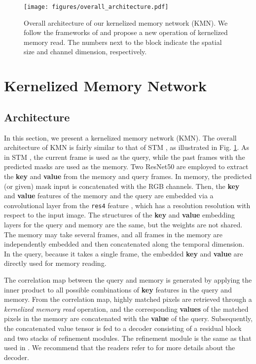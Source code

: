\documentclass[runningheads]{llncs}
\begin{document}
\begin{figure}[t]
\centering
\texttt{[image: figures/overall\_architecture.pdf]}
\caption{
Overall architecture of our kernelized memory network (KMN). We follow the frameworks of \cite{Oh_2019_ICCV} and propose a new operation of kernelized memory read. The numbers next to the block indicate the spatial size and channel dimension, respectively.
}
\label{fig:overall_architecture}
\end{figure}

\section{Kernelized Memory Network}
\label{s3}

\subsection{Architecture}
\label{s31}
In this section, we present a kernelized memory network (KMN). The overall architecture of KMN is fairly similar to that of STM \cite{Oh_2019_ICCV}, as illustrated in Fig. \ref{fig:overall_architecture}. As in STM \cite{Oh_2019_ICCV}, the current frame is used as the query, while the past frames with the predicted masks are used as the memory. Two ResNet50 \cite{b23} are employed to extract the \textbf{key} and \textbf{value} from the memory and query frames. In memory, the predicted (or given) mask input is concatenated with the RGB channels. Then, the \textbf{key} and \textbf{value} features of the memory and the query are embedded via a convolutional layer from the \texttt{res4} feature \cite{b23}, which has a  resolution resolution with respect to the input image. The structures of the \textbf{key} and \textbf{value} embedding layers for the query and memory are the same, but the weights are not shared. The memory may take several frames, and all frames in the memory are independently embedded and then concatenated along the temporal dimension. In the query, because it takes a single frame, the embedded \textbf{key} and \textbf{value} are directly used for memory reading.

The correlation map between the query and memory is generated by applying the inner product to all possible combinations of \textbf{key} features in the query and memory. From the correlation map, highly matched pixels are retrieved through a \textit{kernelized memory read} operation, and the corresponding \textbf{values} of the matched pixels in the memory are concatenated with the \textbf{value} of the query. Subsequently, the concatenated value tensor is fed to a decoder consisting of a residual block \cite{he2016identity} and two stacks of refinement modules. The refinement module is the same as that used in \cite{Oh_2019_ICCV,wug2018fast}. We recommend that the readers refer to \cite{Oh_2019_ICCV} for more details about the decoder.
\end{document}
